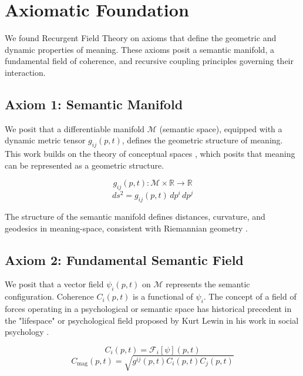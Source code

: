 \chapter{Axiomatic Foundation}

We found Recurgent Field Theory on axioms that define the geometric and dynamic properties of meaning. These axioms posit a semantic manifold, a fundamental field of coherence, and recursive coupling principles governing their interaction.

\section{Axiom 1: Semantic Manifold}

We posit that a differentiable manifold \(\mathcal{M}\) (semantic space), equipped with a dynamic metric tensor \(g_{ij}(p,t)\), defines the geometric structure of meaning. This work builds on the theory of conceptual spaces \autocite{Gardenfors2000}, which posits that meaning can be represented as a geometric structure.

\begin{equation}
g_{ij}(p,t) : \mathcal{M} \times \mathbb{R} \rightarrow \mathbb{R}
\end{equation}
\begin{equation}
ds^2 = g_{ij}(p,t) \, dp^i \, dp^j
\end{equation}

The structure of the semantic manifold defines distances, curvature, and geodesics in meaning-space, consistent with Riemannian geometry \autocite{Riemann1868}.

\section{Axiom 2: Fundamental Semantic Field}

We posit that a vector field \(\psi_i(p,t)\) on \(\mathcal{M}\) represents the semantic configuration. Coherence \(C_i(p,t)\) is a functional of \(\psi_i\). The concept of a field of forces operating in a psychological or semantic space has historical precedent in the "lifespace" or psychological field proposed by Kurt Lewin in his work in social psychology \autocite{Lewin1951}.

\begin{equation}
C_i(p,t) = \mathcal{F}_i[\psi](p,t)
\end{equation}
\begin{equation}
C_{\text{mag}}(p,t) = \sqrt{g^{ij}(p,t) C_i(p,t) C_j(p,t)}
\end{equation}

